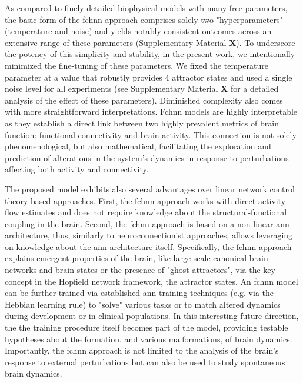 \documentclass{article}
\begin{document}
As compared to finely detailed biophysical models with many free parameters, the basic form of the \acrshort{fchnn} approach comprises solely two "hyperparameters" (temperature and noise) and yields notably consistent outcomes across an extensive range of these parameters (Supplementary Material \textbf{X}). To underscore the potency of this simplicity and stability, in the present work, we intentionally minimized the fine-tuning of these parameters. We fixed the temperature parameter at a value that robustly provides 4 attractor states and used a single noise level for all experiments (see Supplementary Material \textbf{X} for a detailed analysis of the effect of these parameters). Diminished complexity also comes with more straightforward interpretations. Fc\acrshort{hnn} models are highly interpretable as they establish a direct link between two highly prevalent metrics of brain function: functional connectivity and brain activity. This connection is not solely phenomenological, but also mathematical, facilitating the exploration and prediction of alterations in the system's dynamics in response to perturbations affecting both activity and connectivity.

The proposed model exhibits also several advantages over linear network control theory-based \citep{gu2015controllability} approaches. First, the \acrshort{fchnn} approach works with direct activity flow estimates and does not require knowledge about the structural-functional coupling in the brain. Second, the \acrshort{fchnn} approach is based on a non-linear \acrshort{ann} architecture, thus, similarly to neuroconnectionist approaches, allows leveraging on knowledge about the \acrshort{ann} architecture itself. Specifically, the \acrshort{fchnn} approach explains emergent properties of the brain, like large-scale canonical brain networks and brain states or the presence of "ghost attractors", via the key concept in the Hopfield network framework, the attractor states. An \acrshort{fchnn} model can be further trained via established \acrshort{ann} training techniques (e.g. via the Hebbian learning rule) to "solve" various tasks or to match altered dynamics during development or in clinical populations. In this interesting future direction, the the training procedure itself becomes part of the model, providing testable hypotheses about the formation, and various malformations, of brain dynamics.
Importantly, the \acrshort{fchnn} approach is not limited to the analysis of the brain's response to external perturbations but can also be used to study spontaneous brain dynamics.
\end{document}
